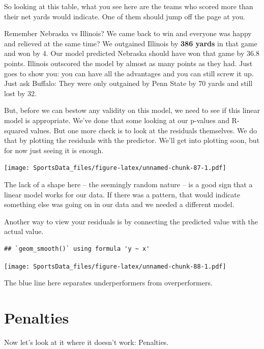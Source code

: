 \documentclass[
]{book}
\newenvironment{Shaded}{\begin{snugshade}}{\end{snugshade}}
\newcommand{\DataTypeTok}[1]{\textcolor[rgb]{0.13,0.29,0.53}{#1}}
\newcommand{\KeywordTok}[1]{\textcolor[rgb]{0.13,0.29,0.53}{\textbf{#1}}}
\newcommand{\NormalTok}[1]{#1}
\newcommand{\OperatorTok}[1]{\textcolor[rgb]{0.81,0.36,0.00}{\textbf{#1}}}
\newcommand{\StringTok}[1]{\textcolor[rgb]{0.31,0.60,0.02}{#1}}
\begin{document}
So looking at this table, what you see here are the teams who scored more than their net yards would indicate. One of them should jump off the page at you.

Remember Nebraska vs Illinois? We came back to win and everyone was happy and relieved at the same time? We outgained Illinois by \textbf{386 yards} in that game and won by 4. Our model predicted Nebraska should have won that game by 36.8 points. Illinois outscored the model by almost as many points as they had. Just goes to show you: you can have all the advantages and you can still screw it up. Just ask Buffalo: They were only outgained by Penn State by 70 yards and still lost by 32.

But, before we can bestow any validity on this model, we need to see if this linear model is appropriate. We've done that some looking at our p-values and R-squared values. But one more check is to look at the residuals themselves. We do that by plotting the residuals with the predictor. We'll get into plotting soon, but for now just seeing it is enough.

\texttt{[image: SportsData\_files/figure-latex/unnamed-chunk-87-1.pdf]}

The lack of a shape here -- the seemingly random nature -- is a good sign that a linear model works for our data. If there was a pattern, that would indicate something else was going on in our data and we needed a different model.

Another way to view your residuals is by connecting the predicted value with the actual value.

\begin{verbatim}
## `geom_smooth()` using formula 'y ~ x'
\end{verbatim}

\texttt{[image: SportsData\_files/figure-latex/unnamed-chunk-88-1.pdf]}

The blue line here separates underperformers from overperformers.

\hypertarget{penalties}{%
\section{Penalties}\label{penalties}}

Now let's look at it where it doesn't work: Penalties.

\begin{Shaded}
\end{Shaded}
\end{document}
